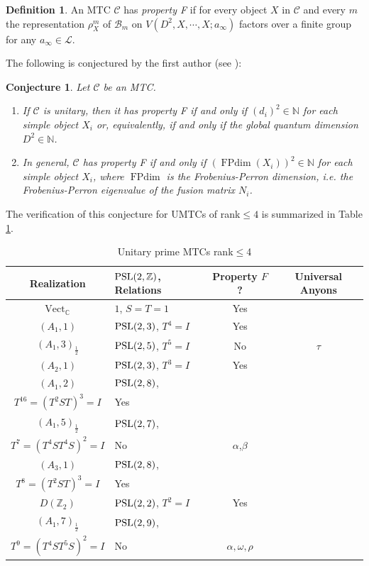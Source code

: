 \documentclass[12pt,psamsfonts]{amsart}
\newcommand{\CC}{\mathcal{C}}
\newcommand{\N}{\mathbb{N}}
\DeclareMathOperator{\FPdim}{FPdim}
\newcommand{\mL}{\mathcal{L}}
\DeclareMathOperator{\Vect}{Vect}
\newcommand{\C}{\mathbb C}
\newcommand{\Z}{\mathbb Z}
\newcommand{\B}{\mathcal{B}}
\numberwithin{equation}{section}
\newtheorem{conj}[theorem]{Conjecture}
\theoremstyle{definition}
\newtheorem{definition}[theorem]{Definition}
\begin{document}
\begin{definition}
An MTC $\CC$ has \emph{property F} if for every object $X$ in
$\CC$ and every $m$ the representation $\rho_X^m$ of $\B_m$ on
$V(D^2,X,\cdots,X;a_{\infty})$ factors over a finite group for any
$a_{\infty}\in \mL$.
\end{definition}

The following is conjectured by the first author (see \cite{propF}):
\begin{conj}
Let $\CC$ be an MTC.
\begin{enumerate}
\item[(a)] If $\CC$ is unitary, then it has property \emph{F} if
and only if $(d_i)^2\in\N$ for each simple object $X_i$ or,
equivalently, if and only if the global quantum dimension
$D^2\in\N$. \item[(b)] In general, $\CC$ has property \emph{F} if
and only if $(\FPdim(X_i))^2\in\N$ for each simple object $X_i$,
where $\FPdim$ is the Frobenius-Perron dimension, i.e. the
Frobenius-Perron eigenvalue of the fusion matrix $N_i$.
\end{enumerate}
\end{conj}

The verification of this conjecture for UMTCs of rank$\leq 4$ is summarized in Table \ref{rank4}.

\begin{table}\caption{Unitary prime MTCs rank$\leq$4}\label{rank4}
\begin{tabular}{|c|p{4cm}|c|c|}
\hline
Realization & $\PSL(2,\Z)$, Relations & Property $F$?& Universal Anyons\\
\hline\hline
$\Vect_\C$ & $1$, $S=T=1$ &Yes& \\
\hline
 $(A_1,1)$ &\raggedright $\operatorname{PSL}(2,3)$, $T^4=I$ &Yes &\\
\hline $(A_1,3)_{\frac{1}{2}}$ & $\operatorname{PSL}(2,5)$, $T^5=I$ &No & $\tau$\\
\hline $(A_2,1)$ & $\operatorname{PSL}(2,3)$, $T^3=I$ &Yes &\\
\hline $(A_1,2)$ &\raggedright $\operatorname{PSL}(2,8)$, \\$T^{16}=(T^2S T)^3=I$ &Yes &\\
\hline $(A_1,5)_{\frac{1}{2}}$ &\raggedright $\operatorname{PSL}(2,7)$,\\ $T^7=(T^4S T^4S)^2=I$ &No & $\alpha$,$\beta$\\
\hline $(A_3,1)$ &\raggedright $\operatorname{PSL}(2,8)$, \\$T^8=(T^2S T)^3=I$ &Yes &\\
\hline $D(\Z_2)$ & $\operatorname{PSL}(2,2)$, $T^2=I$ &Yes &\\
\hline $(A_1,7)_{\frac{1}{2}}$ &\raggedright $\operatorname{PSL}(2,9)$, \\$T^9=(T^4S T^5S)^2=I$ &No &$\alpha,\omega,\rho$\\
\hline
\end{tabular}
\end{table}
\end{document}
